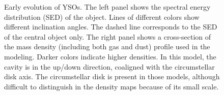 \begin{figure}[!h]
\begin{center}
 \par\medskip
{} 
\caption[Early evolution of YSOs]{Early evolution of YSOs. The left panel shows the spectral energy distribution (SED) of the object. Lines of different colors show different inclination angles. The dashed line corresponds to the SED of the central object only. The right panel shows a cross-section of the mass density (including both gas and dust) profile used in the modeling. Darker colors indicate higher densities. In this model, the cavity is in the up/down direction, coaligned with the circumstellar disk axis. The circumstellar disk is present in those models, although difficult to distinguish in the density maps because of its small scale.}
\label{fig:EarlyStages}
\end{center}
\end{figure}

